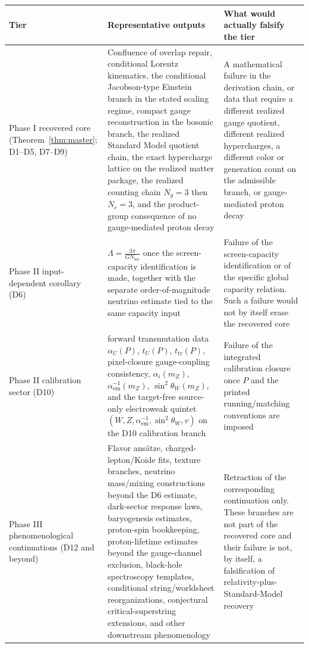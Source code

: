 \documentclass[11pt]{article}
\begin{document}
\begingroup
\footnotesize
\begin{longtable}{@{}>{\raggedright\arraybackslash}p{}>{\raggedright\arraybackslash}p{}>{\raggedright\arraybackslash}p{}@{}}
\toprule
Tier & Representative outputs & What would actually falsify the tier \\
\midrule
\endhead
\bottomrule
\endfoot
Phase I recovered core (Theorem~\ref{thm:master}; D1--D5, D7--D9) & Confluence of overlap repair, conditional Lorentz kinematics, the conditional Jacobson-type Einstein branch in the stated scaling regime, compact gauge reconstruction in the bosonic branch, the realized Standard Model quotient chain, the exact hypercharge lattice on the realized matter package, the realized counting chain \(N_g=3\) then \(N_c=3\), and the product-group consequence of no gauge-mediated proton decay & A mathematical failure in the derivation chain, or data that require a different realized gauge quotient, different realized hypercharges, a different color or generation count on the admissible branch, or gauge-mediated proton decay \\
Phase II input-dependent corollary (D6) & \(\Lambda=\frac{3\pi}{G N_{\mathrm{scr}}}\) once the screen-capacity identification is made, together with the separate order-of-magnitude neutrino estimate tied to the same capacity input & Failure of the screen-capacity identification or of the specific global capacity relation. Such a failure would not by itself erase the recovered core \\
Phase II calibration sector (D10) & forward transmutation data \(\alpha_U(P)\), \(t_U(P)\), \(t_{\mathrm{tr}}(P)\), pixel-closure gauge-coupling consistency, \(\alpha_i(m_Z)\), \(\alpha_{\mathrm{em}}^{-1}(m_Z)\), \(\sin^2\theta_W(m_Z)\), and the target-free source-only electroweak quintet \((W,Z,\alpha_{\mathrm{em}}^{-1},\sin^2\theta_W,v)\) on the D10 calibration branch & Failure of the integrated calibration closure once \(P\) and the printed running/matching conventions are imposed \\
Phase III phenomenological continuations (D12 and beyond) & Flavor ans\"atze, charged-lepton/Koide fits, texture branches, neutrino mass/mixing constructions beyond the D6 estimate, dark-sector response laws, baryogenesis estimates, proton-spin bookkeeping, proton-lifetime estimates beyond the gauge-channel exclusion, black-hole spectroscopy templates, conditional string/worldsheet reorganizations, conjectural critical-superstring extensions, and other downstream phenomenology & Retraction of the corresponding continuation only. These branches are not part of the recovered core and their failure is not, by itself, a falsification of relativity-plus-Standard-Model recovery \\
\end{longtable}
\endgroup
\end{document}
